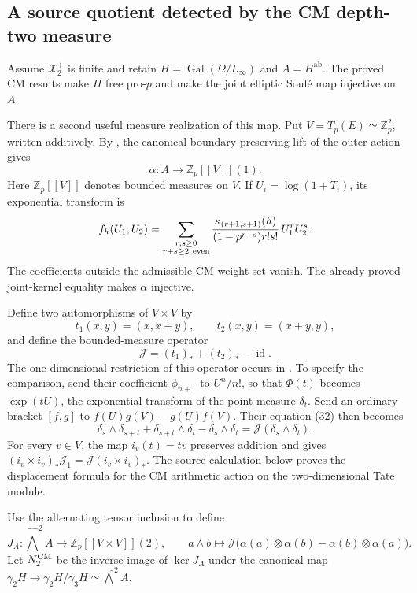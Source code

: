 \subsection{A source quotient detected by the CM depth-two measure}
\label{subsec:cm-measure-class-two}

Assume \(\mathcal X_2^+\) is finite and retain
\(H=\operatorname{Gal}(\Omega/L_\infty)\) and
\(A=H^{\mathrm{ab}}\).  The proved CM results make \(H\)
free pro-\(p\) and make the joint elliptic Soul\'e map
injective on \(A\).

There is a second useful measure realization of this map.
Put \(V=T_p(E)\simeq\mathbb Z_p^2\), written additively.
By \cite[Lemma 2.4, Definition 2.5 and Theorem 2.6,
pp.~7--8]{Ishii}, the canonical boundary-preserving
lift of the outer action gives
\[
 \alpha:A\longrightarrow
       \mathbb Z_p[[V]](1).
\]
Here \(\mathbb Z_p[[V]]\) denotes bounded measures on \(V\).
If \(U_i=\log(1+T_i)\), its exponential transform is
\[
 f_h(U_1,U_2)
 =\sum_{\substack{r,s\geq0\\r+s\geq2\ {\rm even}}}
 \frac{\kappa_{(r+1,s+1)}(h)}
      {(1-p^{r+s})r!s!}\,U_1^rU_2^s .
\]
The coefficients outside the admissible CM weight set
vanish.  The already proved joint-kernel equality makes
\(\alpha\) injective.

Define two automorphisms of \(V\times V\) by
\[
 t_1(x,y)=(x,x+y),\qquad t_2(x,y)=(x+y,y),
\]
and define the bounded-measure operator
\[
 \mathcal J=(t_1)_*+(t_2)_*-\operatorname{id}.
\]
The one-dimensional restriction of this operator occurs in
\cite[equations (29) and (32), p.~233]{LuqueNovelliThibon}.
To specify the comparison, send their coefficient
\(\phi_{n+1}\) to \(U^n/n!\), so that
\(\Phi(t)\) becomes \(\exp(tU)\), the exponential transform
of the point measure \(\delta_t\). Send an ordinary bracket
\([f,g]\) to \(f(U)g(V)-g(U)f(V)\). Their equation (32)
then becomes
\[
 \delta_s\wedge\delta_{s+t}
 +\delta_{s+t}\wedge\delta_t-\delta_s\wedge\delta_t
                 =\mathcal J(\delta_s\wedge\delta_t).
\]
For every \(v\in V\), the map \(i_v(t)=tv\) preserves
addition and gives
\((i_v\times i_v)_*\mathcal J_1
 =\mathcal J(i_v\times i_v)_*\).
The source calculation below proves the displacement formula
for the CM arithmetic action on the two-dimensional Tate module.

Use the alternating tensor inclusion to define
\[
 J_A:\widehat{\bigwedge}^2 A
 \longrightarrow\mathbb Z_p[[V\times V]](2),\qquad
 a\wedge b\longmapsto
 \mathcal J\bigl(\alpha(a)\otimes\alpha(b)
                         -\alpha(b)\otimes\alpha(a)\bigr).
\]
Let \(N_2^{\rm CM}\) be the inverse image of
\(\ker J_A\) under the canonical map
\(\gamma_2H\to\gamma_2H/\gamma_3H
 \simeq\widehat{\bigwedge}^2A\).

